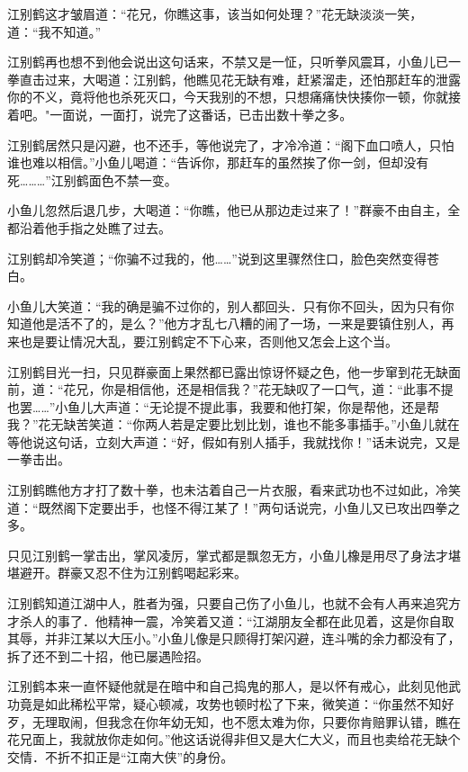 \documentclass[12pt,oneside]{book}
\begin{document}
江别鹤这才皱眉道：``花兄，你瞧这事，该当如何处理？''花无缺淡淡一笑，道：``我不知道。''

江别鹤再也想不到他会说出这句话来，不禁又是一怔，只听拳风震耳，小鱼儿已一拳直击过来，大喝道：江别鹤，他瞧见花无缺有难，赶紧溜走，还怕那赶车的泄露你的不义，竟将他也杀死灭口，今天我别的不想，只想痛痛快快揍你一顿，你就接着吧。"一面说，一面打，说完了这番话，已击出数十拳之多。

江别鹤居然只是闪避，也不还手，等他说完了，才冷冷道：``阁下血口喷人，只怕谁也难以相信。''小鱼儿喝道：``告诉你，那赶车的虽然挨了你一剑，但却没有死\ldots\ldots\ldots{}''江别鹤面色不禁一变。

小鱼儿忽然后退几步，大喝道：``你瞧，他已从那边走过来了！''群豪不由自主，全都沿着他手指之处瞧了过去。

江别鹤却冷笑道；``你骗不过我的，他\ldots\ldots{}''说到这里骤然住口，脸色突然变得苍白。

小鱼儿大笑道：``我的确是骗不过你的，别人都回头．只有你不回头，因为只有你知道他是活不了的，是么？''他方才乱七八糟的闹了一场，一来是要镇住别人，再来也是要让情况大乱，要江别鹤定不下心来，否则他又怎会上这个当。

江别鹤目光一扫，只见群豪面上果然都已露出惊讶怀疑之色，他一步窜到花无缺面前，道：``花兄，你是相信他，还是相信我？''花无缺叹了一口气，道：``此事不提也罢\ldots\ldots{}''小鱼儿大声道：``无论提不提此事，我要和他打架，你是帮他，还是帮我？''花无缺苦笑道：``你两人若是定要比划比划，谁也不能多事插手。''小鱼儿就在等他说这句话，立刻大声道：``好，假如有别人插手，我就找你！''话未说完，又是一拳击出。

江别鹤瞧他方才打了数十拳，也未沽着自己一片衣服，看来武功也不过如此，冷笑道：``既然阁下定要出手，也怪不得江某了！''两句话说完，小鱼儿又已攻出四拳之多。

只见江别鹤一掌击出，掌风凌厉，掌式都是飘忽无方，小鱼儿橡是用尽了身法才堪堪避开。群豪又忍不住为江别鹤喝起彩来。

江别鹤知道江湖中人，胜者为强，只要自己伤了小鱼儿，也就不会有人再来追究方才杀人的事了．他精神一震，冷笑着又道：``江湖朋友全都在此见着，这是你自取其辱，并非江某以大压小。''小鱼儿像是只顾得打架闪避，连斗嘴的余力都没有了，拆了还不到二十招，他已屡遇险招。

江别鹤本来一直怀疑他就是在暗中和自己捣鬼的那人，是以怀有戒心，此刻见他武功竟是如此稀松平常，疑心顿减，攻势也顿时松了下来，微笑道：``你虽然不知好歹，无理取闹，但我念在你年幼无知，也不愿太难为你，只要你肯赔罪认错，瞧在花兄面上，我就放你走如何。''他这话说得非但又是大仁大义，而且也卖给花无缺个交情．不折不扣正是``江南大侠''的身份。
\end{document}
